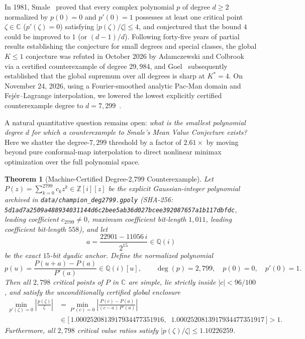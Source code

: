 \documentclass[11pt,a4paper]{amsart}
\newtheorem{theorem}{Theorem}
\theoremstyle{remark}
\newcommand{\C}{\mathbb{C}}
\newcommand{\Q}{\mathbb{Q}}
\newcommand{\Z}{\mathbb{Z}}
\begin{document}
In 1981, Smale~\cite{Smale81} proved that every complex polynomial $p$ of degree
$d \ge 2$ normalized by $p(0) = 0$ and $p'(0) = 1$ possesses at least one
critical point $\zeta \in \C$ ($p'(\zeta) = 0$) satisfying
$|p(\zeta)/\zeta| \le 4$, and conjectured that the bound $4$ could be improved
to $1$ (or $(d-1)/d$). Following forty-five years of partial results establishing
the conjecture for small degrees and special classes, the global $K \le 1$
conjecture was refuted in October 2026 by Adamczewski and Colbrook~\cite{AC26}
via a certified counterexample of degree $29{,}984$, and Goel~\cite{Goel2026}
subsequently established that the global supremum over all degrees is sharp at
$K^* = 4$. On November 24, 2026, using a Fourier-smoothed analytic Pac-Man
domain and Fej\'er--Lagrange interpolation, we lowered the lowest explicitly
certified counterexample degree to $d = 7{,}299$~\cite{Besevic7299}.

A natural quantitative question remains open: \emph{what is the smallest
polynomial degree $d$ for which a counterexample to Smale's Mean Value Conjecture
exists?} Here we shatter the degree-$7{,}299$ threshold by a factor of $2.61\times$
by moving beyond pure conformal-map interpolation to direct nonlinear minimax
optimization over the full polynomial space.

\begin{theorem}[Machine-Certified Degree-2,799 Counterexample]\label{thm:smale2799}
Let $P(z) = \sum_{k=0}^{2799} c_k z^k \in \Z[i][z]$ be the explicit
Gaussian-integer polynomial archived in \texttt{data/champion\_deg2799.gpoly}
(SHA-256: \texttt{\scriptsize 5d1ad7a2509a488934031144d6c2bee5ab36d027bcee392087657a1b117dbfdc},
leading coefficient $c_{2799} \neq 0$, maximum coefficient bit-length $1{,}011$,
leading coefficient bit-length $558$), and let
\[
  a = \frac{22901 - 11056\,i}{2^{15}} \in \Q(i)
\]
be the exact $15$-bit dyadic anchor. Define the normalized polynomial
\[
  p(u) = \frac{P(u + a) - P(a)}{P'(a)} \in \Q(i)[u],
  \qquad \deg(p) = 2{,}799, \quad p(0) = 0, \quad p'(0) = 1.
\]
Then all $2{,}798$ critical points of $P$ in $\C$ are simple, lie strictly inside
$|c| < 96/100$, and satisfy the unconditionally certified global enclosure
\begin{equation}\label{eq:certified-min}
\begin{aligned}
  \min_{p'(\zeta) = 0} \left|\frac{p(\zeta)}{\zeta}\right|
  &= \min_{P'(c) = 0} \left|\frac{P(c) - P(a)}{(c - a)\, P'(a)}\right| \\
  &\in \bigl[\,1.0002520813917934477351916,\;\;
               1.0002520813917934477351917\,\bigr] > 1.
\end{aligned}
\end{equation}
Furthermore, all $2{,}798$ critical value ratios satisfy
$|p(\zeta)/\zeta| \le 1.10226259$.
\end{theorem}
\end{document}
